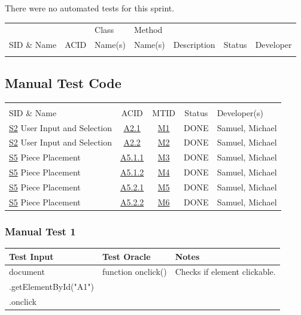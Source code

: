\documentclass[11pt]{article}
\begin{document}
There were no automated tests for this sprint.

\begin{center}
\begin{tabular}{|l|l|p{2.5cm}|p{2.5cm}|p{2.5cm}|l|l|}
 &  & Class & Method &  &  & \\
SID \& Name & ACID & Name(s) & Name(s) & Description & Status & Developer\\
\hline
 &  &  &  &  &  & \\
\end{tabular}
\end{center}
\subsection{Manual Test Code}
\label{sec:orgec37e07}
\begin{center}
\begin{tabular}{|p{4.5cm}|c|c|c|p{3.0cm}|}
 &  &  &  & \\
SID \& Name & ACID & MTID & Status & Developer(s)\\
\hline
\hyperref[sec:orgab45011]{S2} User Input and Selection & \hyperref[sec:org29e3adf]{A2.1} & \hyperref[sec:org956c1b9]{M1} & DONE & Samuel, Michael\\
\hyperref[sec:orgab45011]{S2} User Input and Selection & \hyperref[sec:org29e3adf]{A2.2} & \hyperref[sec:org796a74a]{M2} & DONE & Samuel, Michael\\
\hyperref[sec:org6bf2eed]{S5} Piece Placement & \hyperref[sec:org560abd4]{A5.1.1} & \hyperref[sec:org84b9add]{M3} & DONE & Samuel, Michael\\
\hyperref[sec:org6bf2eed]{S5} Piece Placement & \hyperref[sec:org560abd4]{A5.1.2} & \hyperref[sec:orgecb1e2f]{M4} & DONE & Samuel, Michael\\
\hyperref[sec:org6bf2eed]{S5} Piece Placement & \hyperref[sec:org560abd4]{A5.2.1} & \hyperref[sec:org2b480ef]{M5} & DONE & Samuel, Michael\\
\hyperref[sec:org6bf2eed]{S5} Piece Placement & \hyperref[sec:org560abd4]{A5.2.2} & \hyperref[sec:org42d4c12]{M6} & DONE & Samuel, Michael\\
\end{tabular}
\end{center}
\subsubsection{Manual Test 1}
\label{sec:org956c1b9}
\begin{center}
\begin{tabular}{|p{6.0cm}|p{4.0cm}|p{3.0cm}|}
Test Input & Test Oracle & Notes\\
\hline
document & function onclick() & Checks if element clickable.\\
.getElementById("A1") &  & \\
.onclick &  & \\
\end{tabular}
\end{center}
\end{document}
